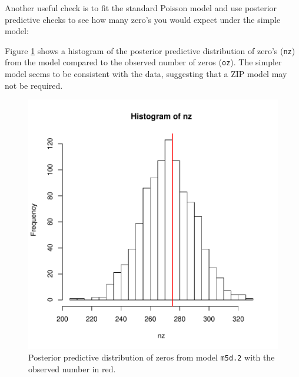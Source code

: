 \documentclass{article}
\begin{document}
Another useful check is to fit the standard Poisson model and use posterior predictive checks to see how many zero's you would expect under the simple model:

\begin{Schunk}
\end{Schunk}

Figure \ref{PPZIP}  shows a histogram of the posterior predictive distribution of zero's (\texttt{nz}) from the model compared to the observed number of zeros (\texttt{oz}). The simpler model seems to be consistent with the data, suggesting that a ZIP model may not be required.


\begin{figure}[!h]
\begin{center}
\includegraphics{Lecture5-043}
\end{center}
\caption{Posterior predictive distribution of zeros from model \texttt{m5d.2} with the observed number in red.}
\label{PPZIP}
\end{figure}
\end{document}
